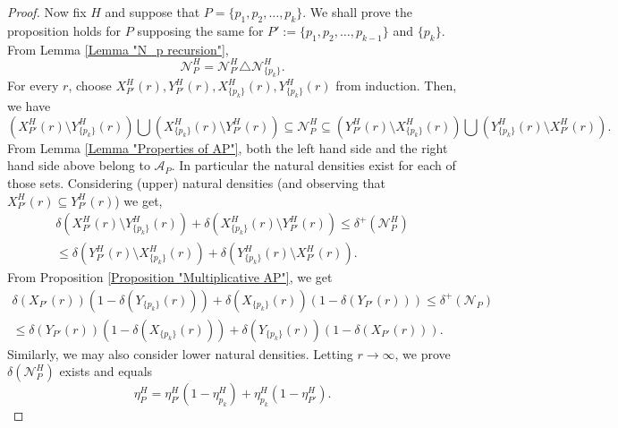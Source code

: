 \documentclass[10pt,a4paper]{amsart}
\begin{document}
\begin{proof}
		Now fix $H$ and suppose that $P = \{p_1,p_2,\ldots, p_k\}$. We shall prove the proposition holds for $P$ supposing the same for $P':=\{p_1,p_2,\ldots, p_{k-1}\}$ and $\{p_k\}$. From Lemma \ref{Lemma "N_p recursion"}, 
		\[
		\mathcal{N}_P^H = \mathcal{N}_{P'}^H\triangle \mathcal{N}_{\{p_k\}}^H.
		\]
		For every $r$, choose $X_{P'}^H(r), Y_{P'}^H(r), X_{\{p_k\}}^H(r), Y_{\{p_k\}}^H(r)$ from induction. Then, we have
		\[
		\left(X_{P'}^H(r)\setminus Y_{\{p_k\}}^H(r)\right) \bigcup \left(X_{\{p_k\}}^H(r) \setminus Y_{P'}^H(r)\right) \subseteq \mathcal{N}_P^H \subseteq \left(Y_{P'}^H(r)\setminus X_{\{p_k\}}^H(r)\right) \bigcup \left(Y_{\{p_k\}}^H(r) \setminus X_{P'}^H(r)\right).
		\]
		From Lemma \ref{Lemma "Properties of AP"}, both the left hand side and the right hand side above belong to $\mathcal{A}_P$. In particular the natural densities exist for each of those sets. Considering (upper) natural densities (and observing that $X_{P'}^H(r)\subseteq Y_{P'}^H(r)$) we get,
		\begin{multline*}
			\delta\left(X_{P'}^H(r)\setminus Y_{\{p_k\}}^H(r)\right) +  \delta\left(X_{\{p_k\}}^H(r) \setminus Y_{P'}^H(r)\right)  \leqslant \delta^+(\mathcal{N}_P^H )\\
			\leqslant \delta\left(Y_{P'}^H(r)\setminus X_{\{p_k\}}^H(r)\right) + \delta \left(Y_{\{p_k\}}^H(r) \setminus X_{P'}^H(r)\right).
		\end{multline*}
		From Proposition \ref{Proposition "Multiplicative AP"}, we get
		\begin{multline*}
			\delta(X_{P'}(r))(1-\delta(Y_{\{p_k\}}(r))) + \delta(X_{\{p_k\}}(r))(1-\delta(Y_{P'}(r))) \leqslant \delta^+(\mathcal{N}_P) \\
			\leqslant \delta(Y_{P'}(r))(1-\delta(X_{\{p_k\}}(r))) + \delta(Y_{\{p_k\}}(r))(1-\delta(X_{P'}(r))).
		\end{multline*}
		Similarly, we may also consider lower natural densities. Letting $r\to\infty$, we prove $\delta(\mathcal{N}_P^H)$ exists and equals
		\begin{equation}\label{Equation "eta_P recursion"}
			\eta_{P}^H = \eta_{P'}^H(1-\eta_{p_k}^H) + \eta_{p_k}^H(1-\eta_{P'}^H).
		\end{equation}
	\end{proof}
\end{document}

